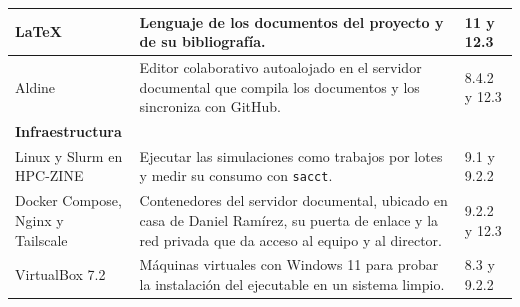 \begin{longtable}{|p{}|p{}|p{}|}
\raggedright \LaTeX~\cite{lamport1994latex} & \raggedright Lenguaje de los documentos del proyecto y de su bibliografía. & \raggedright 11 y 12.3\tabularnewline\hline
\raggedright Aldine & \raggedright Editor colaborativo autoalojado en el servidor documental que compila los documentos y los sincroniza con GitHub. & \raggedright 8.4.2 y 12.3\tabularnewline\hline
\multicolumn{3}{|l|}{\textbf{Infraestructura}}\tabularnewline\hline
\raggedright Linux y Slurm en HPC-ZINE~\cite{yoo2003slurm,fdslinuxcluster} & \raggedright Ejecutar las simulaciones como trabajos por lotes y medir su consumo con \texttt{sacct}. & \raggedright 9.1 y 9.2.2\tabularnewline\hline
\raggedright Docker Compose, Nginx y Tailscale~\cite{dockercompose,nginx,tailscale} & \raggedright Contenedores del servidor documental, ubicado en casa de Daniel Ramírez, su puerta de enlace y la red privada que da acceso al equipo y al director. & \raggedright 9.2.2 y 12.3\tabularnewline\hline
\raggedright VirtualBox 7.2~\cite{virtualbox} & \raggedright Máquinas virtuales con Windows 11 para probar la instalación del ejecutable en un sistema limpio. & \raggedright 8.3 y 9.2.2\tabularnewline\hline
\end{longtable}



